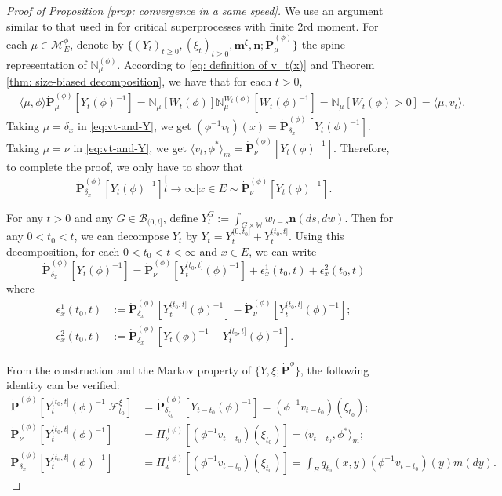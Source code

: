 \documentclass[12pt, a4paper]{amsart}
\theoremstyle{definition}
\numberwithin{equation}{section}
\begin{document}
\begin{proof}[Proof of Proposition \ref{prop: convergence in a same speed}]
	We use an argument similar to that used in \cite{RenSongSun2017Spine} for critical superprocesses with finite 2rd moment.
	For each $\mu\in\mathcal M^\phi_E$, denote by $\{(Y_t)_{t\geq 0}, (\xi_t)_{t\geq 0},\mathbf m^\xi, \mathbf n; \dot {\mathbf P}^{(\phi)}_\mu\}$ the spine representation of $\mathbb N^{(\phi)}_\mu$.
	According to \eqref{eq: definition of v_t(x)} and Theorem \ref{thm: size-biased decomposition}, we have that for each $t>0$,
\[\begin{split}\label{eq:vt-and-Y}
	&\langle \mu,\phi \rangle \dot {\mathbf P}^{(\phi)}_\mu [Y_t(\phi)^{-1}]
	= \mathbb N_\mu[W_t(\phi)] \mathbb N^{W_t(\phi)}_\mu [W_t(\phi)^{-1}]
	= \mathbb N_\mu[W_t(\phi) > 0]
	= \langle \mu,v_t \rangle.
\end{split}\]
	Taking $\mu = \delta_x$ in \eqref{eq:vt-and-Y}, we get $(\phi^{-1}v_t)(x) =\dot{\mathbf P}_{\delta_x}^{(\phi)}[Y_t(\phi)^{-1}]$.
	Taking $\mu = \nu$ in \eqref{eq:vt-and-Y}, we get $\langle v_t, \phi^*\rangle_m = \dot {\mathbf P}_{\nu}^{(\phi)} [Y_t(\phi)^{-1}]$.
	Therefore, to complete the proof, we only have to show that
\[
	\dot{\mathbf P}_{\delta_x}^{(\phi)}[Y_t(\phi)^{-1}]
	\stackrel[t\to \infty]{x\in E}{\sim}  \dot {\mathbf P}_\nu^{(\phi)} [Y_t(\phi)^{-1}].
\]

	For any $t>0$ and any $G\in \mathscr B_{(0,t]}$, define
$
	Y^G_t
	:= \int_{G\times \mathbb W} w_{t-s} \mathbf n(ds,dw).
$
	Then for any $0 < t_0 < t$, we can decompose $Y_t$ by
$
	Y_t
	= Y^{(0,t_0]}_t + Y^{(t_0,t]}_t.
$
	Using this decomposition, for each $0<t_0<t<\infty$ and $x\in E$, we can write
\[\label{eq: starting point of phi-1v_t(x)}
	 \dot{\mathbf P}_{\delta_x}^{(\phi)}[Y_t(\phi)^{-1}]
	= \dot {\mathbf P}_\nu^{(\phi)} [Y^{(t_0,t]}_t(\phi)^{-1}] + \epsilon_x^1(t_0,t) +\epsilon_x^2(t_0,t)
\]
	where 
\[\begin{split}
	\epsilon_x^1(t_0,t) 
	&:= \dot {\mathbf P}_{\delta_x}^{(\phi)} [Y^{(t_0,t]}_t(\phi)^{-1}] - \dot {\mathbf P}_\nu^{(\phi)} [Y^{(t_0,t]}_t(\phi)^{-1}];
	\\\epsilon_x^2(t_0,t)
	&:= \dot{\mathbf P}_{\delta_x}^{(\phi)}[Y_t(\phi)^{-1} - Y^{(t_0,t]}_t(\phi)^{-1}].
\end{split}\]

	From the construction and the Markov property of $\{Y,\xi; \dot {\mathbf P}^{\phi}\}$, the following identity can be verified:
\[\label{eq: some equations for PY-1}\begin{split}
	\dot{\mathbf P}^{(\phi)} [Y_t^{(t_0,t]}(\phi)^{-1}|\mathscr F^\xi_{t_0}]
	&= \dot{\mathbf P}_{\delta_{\xi_{t_0}}}^{(\phi)}  [Y_{t-t_0}(\phi)^{-1}]
	= (\phi^{-1}v_{t-t_0})(\xi_{t_0});
	\\ \dot{\mathbf P}_\nu^{(\phi)}[Y_t^{(t_0,t]}(\phi)^{-1}]
	&= \Pi_{\nu}^{(\phi)}[(\phi^{-1}v_{t-t_0})(\xi_{t_0}) ]
	= \langle v_{t-t_0},\phi^* \rangle_m;
	\\ \dot{\mathbf P}_{\delta_x}^{(\phi)}[Y_t^{(t_0,t]}(\phi)^{-1}]
	&= \Pi_x^{(\phi)}[(\phi^{-1}v_{t-t_0})(\xi_{t_0}) ]
	=  \int_E  q_{t_0}(x,y)(\phi^{-1}v_{t-t_0})(y) m(dy).
\end{split}\]


\end{proof}
\end{document}
